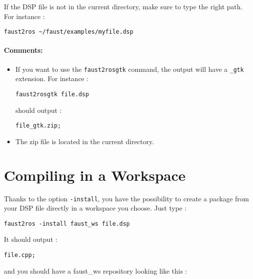 If the DSP file is not in the current directory, make sure to type the right path. For instance :
\begin{lstlisting}
faust2ros ~/faust/examples/myfile.dsp
\end{lstlisting}


\paragraph{Comments:}
\begin{itemize}
	\item If you want to use the \lstinline'faust2rosgtk' command, the output will have a \lstinline'_gtk' extension. For instance :
		\begin{lstlisting}
faust2rosgtk file.dsp
		\end{lstlisting}
		should output :
		\begin{lstlisting}
file_gtk.zip;
		\end{lstlisting}
	\item The zip file is located in the current directory.
	
\end{itemize} 

\newpage
\section{Compiling in a Workspace}
Thanks to the option \lstinline'-install', you have the possibility to create a package from your DSP file directly in a workspace you choose.
Just type :
\begin{lstlisting}
faust2ros -install faust_ws file.dsp
\end{lstlisting}

It should output : 
\begin{lstlisting}
file.cpp; 
\end{lstlisting}
and you should have a faust\_ws repository looking like this :\\


